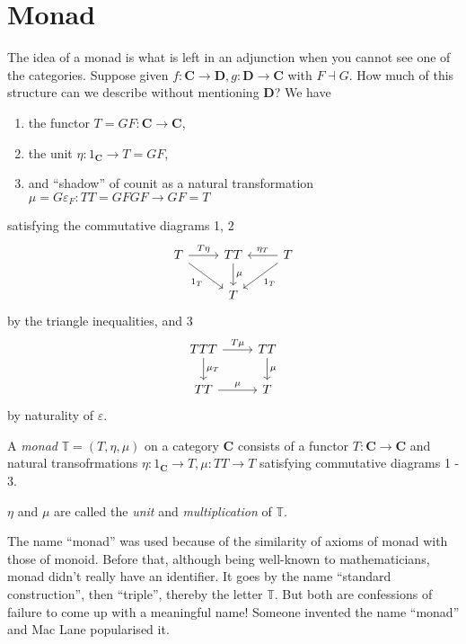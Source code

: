 \documentclass[a4paper]{article}
\renewcommand{\c}[1]{\mathbf{#1}}
\newcommand{\adjoint}{\dashv}
\newcommand{\T}{{\mathbb{T}}} %
\begin{document}
\section{Monad}

The idea of a monad is what is left in an adjunction when you cannot see one of the categories. Suppose given \(f: \c C \to \c D, g: \c D \to \c C\) with \(F \adjoint G\). How much of this structure can we describe without mentioning \(\c D\)? We have
\begin{enumerate}
\item the functor \(T = GF: \c C \to \c C\),
\item the unit \(\eta: 1_{\c C} \to T = GF\),
\item and ``shadow'' of counit as a natural transformation \(\mu = G\varepsilon_F: TT = GFGF \to GF = T\)
\end{enumerate}
satisfying the commutative diagrams 1, 2
\[
  \begin{tikzcd}
    T \ar[r, "T\eta"] \ar[dr, "1_T"'] & TT \ar[d, "\mu"] & T \ar[l, "\eta_T"'] \ar[dl, "1_T"] \\
    & T
  \end{tikzcd}
\]
by the triangle inequalities, and 3
\[
  \begin{tikzcd}
    TTT \ar[r, "T\mu"] \ar[d, "\mu_T"] & TT \ar[d, "\mu"] \\
    TT \ar[r, "\mu"] & T
  \end{tikzcd}
\]
by naturality of \(\varepsilon\).

\begin{definition}[monad]
  A \emph{monad} \(\T = (T, \eta, \mu)\) on a category \(\c C\) consists of a functor \(T: \c C \to \c C\) and natural transofrmations \(\eta: 1_{\c C} \to T, \mu: TT \to T\) satisfying commutative diagrams 1 - 3.

  \(\eta\) and \(\mu\) are called the \emph{unit} and \emph{multiplication} of \(\T\).
\end{definition}

The name ``monad'' was used because of the similarity of axioms of monad with those of monoid. Before that, although being well-known to mathematicians, monad didn't really have an identifier. It goes by the name ``standard construction'', then ``triple'', thereby the letter \(\T\). But both are confessions of failure to come up with a meaningful name! Someone invented the name ``monad'' and Mac Lane popularised it.
\end{document}
